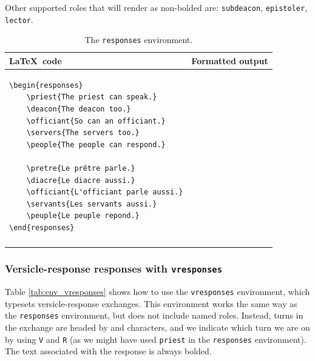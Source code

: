 \documentclass{article}
\begin{document}
Other supported roles that will render as non-bolded are: \lstinline{subdeacon}, \lstinline{epistoler}, \lstinline{lector}.

\begin{table}[h!]
\centering
\begin{tabular}{ll}
\toprule
\LaTeX\ code & Formatted output \\
\midrule
\begin{lstlisting}
\begin{responses}
	\priest{The priest can speak.}
	\deacon{The deacon too.}
	\officiant{So can an officiant.}
	\servers{The servers too.}
	\people{The people can respond.}

	\pretre{Le prêtre parle.}
	\diacre{Le diacre aussi.}
	\officiant{L'officiant parle aussi.}
	\servants{Les servants aussi.}
	\peuple{Le peuple repond.}
\end{responses}
\end{lstlisting}
&
\sabon{ 
\begin{responsesex}
	\priest{The priest can speak.}
	\deacon{The deacon too.}
	\officiant{So can an officiant.}
	\servers{The servers too.}
	\people{The people can respond.}
	& \\
	\pretre{Le prêtre parle.}
	\diacre{Le diacre aussi.}
	\officiant{L'officiant parle aussi.}
	\servants{Les servants aussi.}
	\peuple{Le peuple repond.}
\end{responsesex}
}
\\
\bottomrule
\end{tabular}
\caption{The \lstinline{responses} environment.}
\label{tab:env_responses}
\end{table}

\subsubsection{Versicle-response responses with \lstinline{vresponses}}

Table \ref{tab:env_vresponses} shows how to use the \lstinline{vresponses} environment, which typesets versicle-response exchanges. This environment works the same way as the \lstinline{responses} environment, but does not include named roles. Instead, turns in the exchange are headed by \versicle and \response characters, and we indicate which turn we are on by using \lstinline{V} and \lstinline{R} (as we might have used \lstinline{priest} in the \lstinline{responses} environment). The text associated with the response is always bolded.
\end{document}
